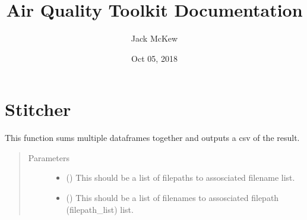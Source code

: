 \documentclass[letterpaper,10pt,english,openany,oneside]{sphinxmanual}
\title{Air Quality Toolkit Documentation}
\date{Oct 05, 2018}
\author{Jack McKew}
\begin{document}
\maketitle
\sphinxtableofcontents
{}\label{\detokenize{index::doc}}



\chapter{Stitcher}
\label{\detokenize{index:stitcher}}\label{\detokenize{index:welcome-to-air-quality-toolkit-s-documentation}}\label{\detokenize{index:module-Stitcher}}

\begin{fulllineitems}
\label{\detokenize{index:Stitcher.Stitcher}}
This function sums multiple dataframes together and outputs a csv of the result.
\begin{quote}\begin{description}
\item[{Parameters}] \leavevmode\begin{itemize}
\item {} 
 (\sphinxstyleliteralemphasis{\sphinxupquote{{[}}}\sphinxstyleliteralemphasis{\sphinxupquote{{]}}}\sphinxstyleliteralemphasis{\sphinxupquote{}}) \textendash{} This should be a list of filepaths to assosciated filename list.

\item {} 
 (\sphinxstyleliteralemphasis{\sphinxupquote{{[}}}\sphinxstyleliteralemphasis{\sphinxupquote{{]}}}\sphinxstyleliteralemphasis{\sphinxupquote{}}) \textendash{} This should be a list of filenames to assosciated filepath (filepath\_list) list.


\end{itemize}
\end{description}
\end{quote}
\end{fulllineitems}
\end{document}
